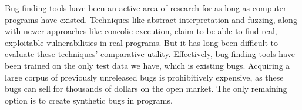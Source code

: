 

Bug-finding tools have been an active area of research for as long as computer programs have existed. Techniques like abstract interpretation and fuzzing, along with newer approaches like concolic execution, claim to be able to find real, exploitable vulnerabilities in real programs.  But it has long been difficult to evaluate these techniques' comparative utility. Effectively, bug-finding tools have been trained on the only test data we have, which is existing bugs. Acquiring a large corpus of previously unreleased bugs is prohibitively expensive, as these bugs can sell for thousands of dollars on the open market. The only remaining option is to create synthetic bugs in programs.